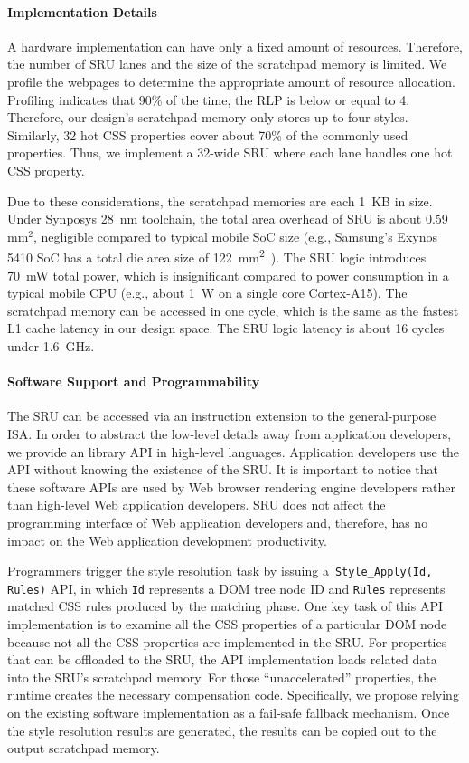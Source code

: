 \paragraph{Implementation Details} A hardware implementation can have only a fixed amount of resources. Therefore, the number of SRU lanes and the size of the scratchpad memory is limited. We profile the webpages to determine the appropriate amount of resource allocation. Profiling indicates that 90\% of the time, the RLP is below or equal to 4. Therefore, our design's scratchpad memory only stores up to four styles. Similarly, 32 hot CSS properties cover about 70\% of the commonly used properties. Thus, we implement a 32-wide SRU where each lane handles one hot CSS property.

Due to these considerations, the scratchpad memories are each 1~KB in size. Under Synposys 28~nm toolchain, the total area overhead of SRU is about 0.59 mm$^2$, negligible compared to typical mobile SoC size (e.g., Samsung's Exynos 5410 SoC has a total die area size of 122~mm\textsuperscript{2}~\cite{exynox5410diesize}). The SRU logic introduces 70~mW total power, which is insignificant compared to power consumption in a typical mobile CPU (e.g., about 1~W on a single core Cortex-A15). The scratchpad memory can be accessed in one cycle, which is the same as the fastest L1 cache latency in our design space. The SRU logic latency is about 16 cycles under 1.6~GHz.

\paragraph{Software Support and Programmability} The SRU can be accessed via an instruction extension to the general-purpose ISA. In order to abstract the low-level details away from application developers, we provide an library API in high-level languages. Application developers use the API without knowing the existence of the SRU. It is important to notice that these software APIs are used by Web browser rendering engine developers rather than high-level Web application developers. SRU does not affect the programming interface of Web application developers and, therefore, has no impact on the Web application development productivity.

Programmers trigger the style resolution task by issuing a~\texttt{Style\_Apply(Id, Rules)} API, in which \texttt{Id} represents a DOM tree node ID and \texttt{Rules} represents matched CSS rules produced by the matching phase. One key task of this API implementation is to examine all the CSS properties of a particular DOM node because not all the CSS properties are implemented in the SRU. For properties that can be offloaded to the SRU, the API implementation loads related data into the SRU's scratchpad memory. For those ``unaccelerated'' properties, the runtime creates the necessary compensation code. Specifically, we propose relying on the existing software implementation as a fail-safe fallback mechanism. Once the style resolution results are generated, the results can be copied out to the output scratchpad memory.

